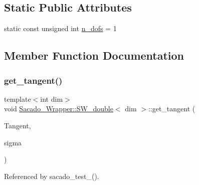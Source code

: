 \subsection*{Static Public Attributes}
\begin{DoxyCompactItemize}
\item 
static const unsigned int \hyperlink{classSacado__Wrapper_1_1SW__double_a45e46904e5fd5be42bb4c9bb7454ffc5}{n\+\_\+dofs} = 1
\end{DoxyCompactItemize}


\subsection{Member Function Documentation}
\mbox{\label{classSacado__Wrapper_1_1SW__double_a2e6eca4457eb22b06172bb5749038f1e}} 
\subsubsection{\texorpdfstring{get\+\_\+tangent()}{get\_tangent()}\hspace{0.1cm}{\footnotesize\ttfamily [1/2]}}
{\footnotesize\ttfamily template$<$int dim$>$ \\
void \hyperlink{classSacado__Wrapper_1_1SW__double}{Sacado\+\_\+\+Wrapper\+::\+S\+W\+\_\+double}$<$ dim $>$\+::get\+\_\+tangent (\begin{DoxyParamCaption}\item[{Symmetric\+Tensor$<$ 2, dim $>$ \&}]{Tangent,  }\item[{Symmetric\+Tensor$<$ 2, dim, \hyperlink{Sacado-auxiliary__functions_8h_a868b94676739e612d9c95940e70892a9}{fad\+\_\+double} $>$ \&}]{sigma }\end{DoxyParamCaption})}



Referenced by sacado\+\_\+test\+\_().



